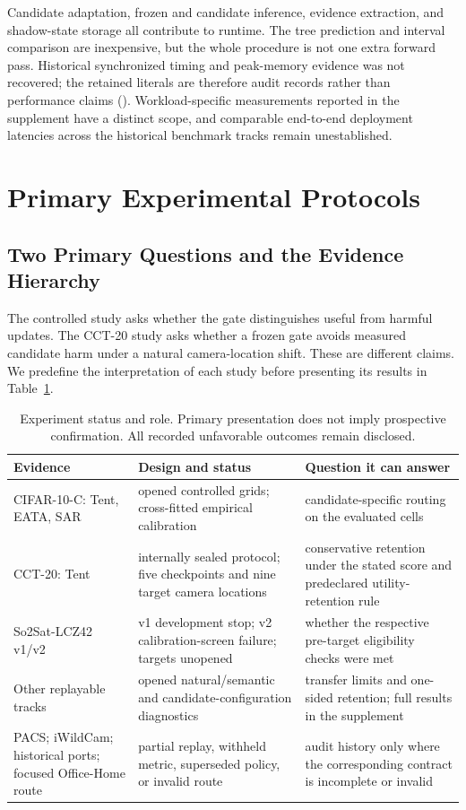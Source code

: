 Candidate adaptation, frozen and candidate inference, evidence extraction, and shadow-state storage
all contribute to runtime. The tree prediction and interval comparison are inexpensive, but the
whole procedure is not one extra forward pass. Historical synchronized timing and peak-memory
evidence was not recovered; the retained literals are therefore audit records rather than performance
claims ().
Workload-specific measurements reported in the supplement have a distinct scope, and comparable
end-to-end deployment latencies across the historical benchmark tracks remain unestablished.

\section{Primary Experimental Protocols}
\label{sec:compact-experiments}

\subsection{Two Primary Questions and the Evidence Hierarchy}

The controlled study asks whether the gate distinguishes useful from harmful updates.
The CCT-20 study asks whether a frozen gate avoids measured candidate harm under a natural
camera-location shift. These are different claims. We predefine the interpretation of each study
before presenting its results in Table~\ref{tab:compact-taxonomy}.

\begin{table}[t]
\centering
\footnotesize
\caption{Experiment status and role. Primary presentation does not imply prospective confirmation.
All recorded unfavorable outcomes remain disclosed.}
\label{tab:compact-taxonomy}
\begin{tabular}{@{}p{}p{}p{}@{}}
\toprule
Evidence & Design and status & Question it can answer \\
\midrule
CIFAR-10-C: Tent, EATA, SAR & opened controlled grids; cross-fitted empirical calibration & candidate-specific routing on the evaluated cells \\
CCT-20: Tent & internally sealed protocol; five checkpoints and nine target camera locations & conservative retention under the stated score and predeclared utility-retention rule \\
So2Sat-LCZ42 v1/v2 & v1 development stop; v2 calibration-screen failure; targets unopened & whether the respective pre-target eligibility checks were met \\
Other replayable tracks & opened natural/semantic and candidate-configuration diagnostics & transfer limits and one-sided retention; full results in the supplement \\
PACS; iWildCam; historical ports; focused Office-Home route & partial replay, withheld metric, superseded policy, or invalid route & audit history only where the corresponding contract is incomplete or invalid \\
\bottomrule
\end{tabular}
\end{table}

